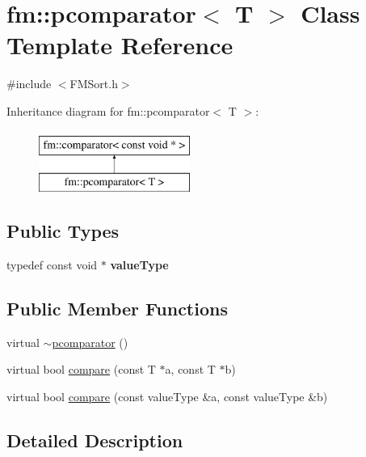 \hypertarget{classfm_1_1pcomparator}{
\section{fm::pcomparator$<$ T $>$ Class Template Reference}
\label{classfm_1_1pcomparator}
}


{\ttfamily \#include $<$FMSort.h$>$}

Inheritance diagram for fm::pcomparator$<$ T $>$:\begin{figure}[H]
\begin{center}
\leavevmode
\includegraphics[height=2.000000cm]{classfm_1_1pcomparator}
\end{center}
\end{figure}
\subsection*{Public Types}
\begin{DoxyCompactItemize}
\item 
\hypertarget{classfm_1_1pcomparator_ab87df99f35a6dd781ab828ade85d5b06}{
typedef const void $\ast$ {\bfseries valueType}}
\label{classfm_1_1pcomparator_ab87df99f35a6dd781ab828ade85d5b06}

\end{DoxyCompactItemize}
\subsection*{Public Member Functions}
\begin{DoxyCompactItemize}
\item 
virtual \hyperlink{classfm_1_1pcomparator_a51d3e370d60cdf97ec446215bab8f96d}{$\sim$pcomparator} ()
\item 
virtual bool \hyperlink{classfm_1_1pcomparator_a52f376a1379f7f119f54c8d6722169ee}{compare} (const T $\ast$a, const T $\ast$b)
\item 
virtual bool \hyperlink{classfm_1_1pcomparator_a66c4ec2eecb10b1606f8271d69474eef}{compare} (const valueType \&a, const valueType \&b)
\end{DoxyCompactItemize}


\subsection{Detailed Description}
